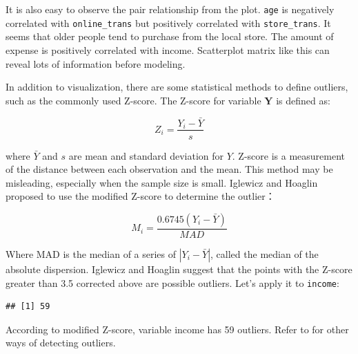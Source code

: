 \documentclass[12pt,]{krantz}
\makeatletter
\newenvironment{Shaded}{\begin{snugshade}}{\end{snugshade}}
\newcommand{\CommentTok}[1]{\textcolor[rgb]{0.37,0.37,0.37}{\textit{#1}}}
\newcommand{\FloatTok}[1]{\textcolor[rgb]{0.06,0.06,0.06}{#1}}
\newcommand{\KeywordTok}[1]{\textcolor[rgb]{0.27,0.27,0.27}{\textbf{#1}}}
\newcommand{\NormalTok}[1]{#1}
\newcommand{\OperatorTok}[1]{\textcolor[rgb]{0.43,0.43,0.43}{\textbf{#1}}}
\newcommand{\StringTok}[1]{\textcolor[rgb]{0.5,0.5,0.5}{#1}}
\newenvironment{kframe}{%
\medskip{}
\setlength{\fboxsep}{.8em}
 \def\at@end@of@kframe{}%
 \ifinner\ifhmode%
  \def\at@end@of@kframe{\end{minipage}}%
  \begin{minipage}{\columnwidth}%
 \fi\fi%
 \def\FrameCommand##1{\hskip\@totalleftmargin \hskip-\fboxsep
 \colorbox{shadecolor}{##1}\hskip-\fboxsep
     \hskip-\linewidth \hskip-\@totalleftmargin \hskip\columnwidth}%
 \MakeFramed {\advance\hsize-\width
   \@totalleftmargin\z@ \linewidth\hsize
   \@setminipage}}%
 {\par\unskip\endMakeFramed%
 \at@end@of@kframe}
\renewenvironment{Shaded}{\begin{kframe}}{\end{kframe}}
\makeatother
\begin{document}
It is also easy to observe the pair relationship from the plot. \texttt{age} is negatively correlated with \texttt{online\_trans} but positively correlated with \texttt{store\_trans}. It seems that older people tend to purchase from the local store. The amount of expense is positively correlated with income. Scatterplot matrix like this can reveal lots of information before modeling.

In addition to visualization, there are some statistical methods to define outliers, such as the commonly used Z-score. The Z-score for variable \(\mathbf{Y}\) is defined as:

\[Z_{i}=\frac{Y_{i}-\bar{Y}}{s}\]

where \(\bar{Y}\) and \(s\) are mean and standard deviation for \(Y\). Z-score is a measurement of the distance between each observation and the mean. This method may be misleading, especially when the sample size is small. Iglewicz and Hoaglin proposed to use the modified Z-score to determine the outlier\citep{mad1}：

\[M_{i}=\frac{0.6745(Y_{i}-\bar{Y})}{MAD}\]

Where MAD is the median of a series of \(|Y_ {i} - \bar{Y}|\), called the median of the absolute dispersion. Iglewicz and Hoaglin suggest that the points with the Z-score greater than 3.5 corrected above are possible outliers. Let's apply it to \texttt{income}:

\begin{Shaded}
\end{Shaded}

\begin{verbatim}
## [1] 59
\end{verbatim}

According to modified Z-score, variable income has 59 outliers. Refer to \citep{mad1} for other ways of detecting outliers.
\end{document}
